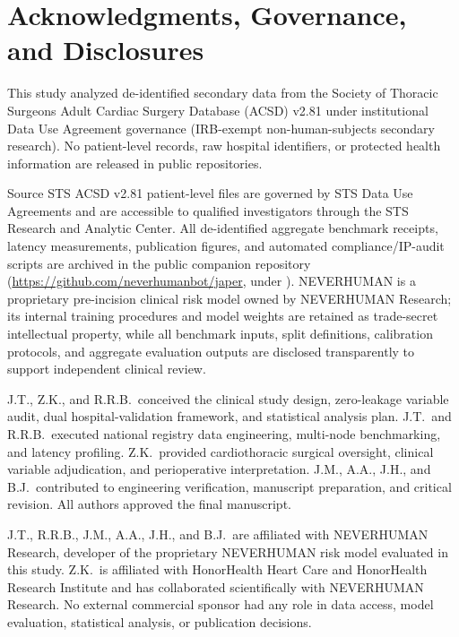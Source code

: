 \section*{Acknowledgments, Governance, and Disclosures}

This study analyzed de-identified secondary data from the Society of Thoracic Surgeons Adult Cardiac Surgery Database (ACSD) v2.81 under institutional Data Use Agreement governance (IRB-exempt non-human-subjects secondary research). No patient-level records, raw hospital identifiers, or protected health information are released in public repositories.

Source STS ACSD v2.81 patient-level files are governed by STS Data Use Agreements and are accessible to qualified investigators through the STS Research and Analytic Center. All de-identified aggregate benchmark receipts, latency measurements, publication figures, and automated compliance/IP-audit scripts are archived in the public companion repository (\url{https://github.com/neverhumanbot/japer}, under ). NEVERHUMAN is a proprietary pre-incision clinical risk model owned by NEVERHUMAN Research; its internal training procedures and model weights are retained as trade-secret intellectual property, while all benchmark inputs, split definitions, calibration protocols, and aggregate evaluation outputs are disclosed transparently to support independent clinical review.

J.T., Z.K., and R.R.B.\ conceived the clinical study design, zero-leakage variable audit, dual hospital-validation framework, and statistical analysis plan. J.T.\ and R.R.B.\ executed national registry data engineering, multi-node benchmarking, and latency profiling. Z.K.\ provided cardiothoracic surgical oversight, clinical variable adjudication, and perioperative interpretation. J.M., A.A., J.H., and B.J.\ contributed to engineering verification, manuscript preparation, and critical revision. All authors approved the final manuscript.

J.T., R.R.B., J.M., A.A., J.H., and B.J.\ are affiliated with NEVERHUMAN Research, developer of the proprietary NEVERHUMAN risk model evaluated in this study. Z.K.\ is affiliated with HonorHealth Heart Care and HonorHealth Research Institute and has collaborated scientifically with NEVERHUMAN Research. No external commercial sponsor had any role in data access, model evaluation, statistical analysis, or publication decisions.
